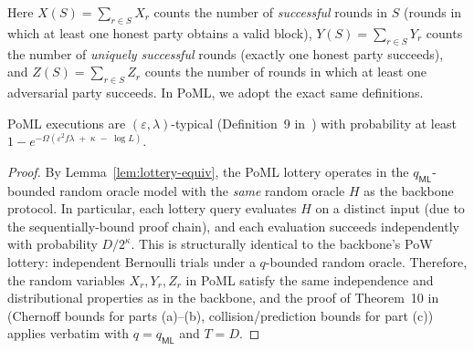 Here $X(S) = \sum_{r \in S} X_r$ counts the number of \emph{successful} rounds in $S$ (rounds in which at least one honest party obtains a valid block), $Y(S) = \sum_{r \in S} Y_r$ counts the number of \emph{uniquely successful} rounds (exactly one honest party succeeds), and $Z(S) = \sum_{r \in S} Z_r$ counts the number of rounds in which at least one adversarial party succeeds. In PoML, we adopt the exact same definitions.

\begin{lemma}
\label{lem:typicality}
PoML executions are $(\varepsilon, \lambda)$-typical (Definition~9 in~\cite{GKL20}) with probability at least
$1 - e^{-\Omega(\varepsilon^2 f \lambda \;+\; \kappa \;-\; \log L)}$.
\end{lemma}

\begin{proof}
By Lemma~\ref{lem:lottery-equiv}, the PoML lottery operates in the $q_{\mathsf{ML}}$-bounded random oracle model with the \emph{same} random oracle $H$ as the backbone protocol. In particular, each lottery query evaluates $H$ on a distinct input (due to the sequentially-bound proof chain), and each evaluation succeeds independently with probability $D/2^\kappa$. This is structurally identical to the backbone's PoW lottery: independent Bernoulli trials under a $q$-bounded random oracle.  Therefore, the random variables $X_r, Y_r, Z_r$ in PoML satisfy the same independence and distributional properties as in the backbone, and the proof of Theorem~10 in~\cite{GKL20} (Chernoff bounds for parts (a)--(b), collision/prediction bounds for part (c)) applies verbatim with $q = q_{\mathsf{ML}}$ and $T = D$.
\end{proof}


